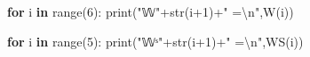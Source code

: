\documentclass[
  letterpaper,
  DIV=11,
  numbers=noendperiod]{scrreprt}
\newenvironment{Shaded}{\begin{snugshade}}{\end{snugshade}}
\newcommand{\BuiltInTok}[1]{\textcolor[rgb]{0.00,0.23,0.31}{#1}}
\newcommand{\CharTok}[1]{\textcolor[rgb]{0.13,0.47,0.30}{#1}}
\newcommand{\ControlFlowTok}[1]{\textcolor[rgb]{0.00,0.23,0.31}{\textbf{#1}}}
\newcommand{\DecValTok}[1]{\textcolor[rgb]{0.68,0.00,0.00}{#1}}
\newcommand{\KeywordTok}[1]{\textcolor[rgb]{0.00,0.23,0.31}{\textbf{#1}}}
\newcommand{\NormalTok}[1]{\textcolor[rgb]{0.00,0.23,0.31}{#1}}
\newcommand{\OperatorTok}[1]{\textcolor[rgb]{0.37,0.37,0.37}{#1}}
\newcommand{\StringTok}[1]{\textcolor[rgb]{0.13,0.47,0.30}{#1}}
\begin{document}
\begin{Shaded}
\begin{Highlighting}[]
\ControlFlowTok{for}\NormalTok{ i }\KeywordTok{in} \BuiltInTok{range}\NormalTok{(}\DecValTok{6}\NormalTok{):}
    \BuiltInTok{print}\NormalTok{(}\StringTok{"𝕎"}\OperatorTok{+}\BuiltInTok{str}\NormalTok{(i}\OperatorTok{+}\DecValTok{1}\NormalTok{)}\OperatorTok{+}\StringTok{" =}\CharTok{\textbackslash{}n}\StringTok{"}\NormalTok{,W(i))}

\ControlFlowTok{for}\NormalTok{ i }\KeywordTok{in} \BuiltInTok{range}\NormalTok{(}\DecValTok{5}\NormalTok{):}
    \BuiltInTok{print}\NormalTok{(}\StringTok{"𝕎ˢ"}\OperatorTok{+}\BuiltInTok{str}\NormalTok{(i}\OperatorTok{+}\DecValTok{1}\NormalTok{)}\OperatorTok{+}\StringTok{" =}\CharTok{\textbackslash{}n}\StringTok{"}\NormalTok{,WS(i))}
\end{Highlighting}
\end{Shaded}
\end{document}
